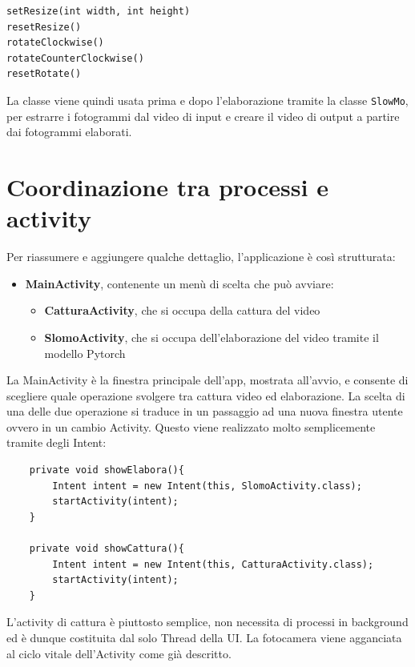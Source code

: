 \begin{lstlisting}
setResize(int width, int height)
resetResize()
rotateClockwise()
rotateCounterClockwise()
resetRotate()
\end{lstlisting}

La classe viene quindi usata prima e dopo l'elaborazione tramite la classe \texttt{SlowMo}, 
per estrarre i fotogrammi dal video di input e creare il video di output a partire dai
fotogrammi elaborati.

\section{Coordinazione tra processi e activity}

Per riassumere e aggiungere qualche dettaglio, l'applicazione è così strutturata:

\begin{itemize}
    \item \textbf{MainActivity}, contenente un menù di scelta che può avviare:
    \begin{itemize}
        \item \textbf{CatturaActivity}, che si occupa della cattura del video
        \item \textbf{SlomoActivity}, che si occupa dell'elaborazione del video tramite il modello Pytorch
    \end{itemize}
\end{itemize}

La MainActivity è la finestra principale dell'app, mostrata all'avvio, e consente di scegliere quale operazione svolgere
tra cattura video ed elaborazione. La scelta di una delle due operazione si traduce in un passaggio ad una nuova
finestra utente ovvero in un cambio Activity. Questo viene realizzato molto semplicemente tramite degli Intent:

\begin{lstlisting}
    private void showElabora(){
        Intent intent = new Intent(this, SlomoActivity.class);
        startActivity(intent);
    }

    private void showCattura(){
        Intent intent = new Intent(this, CatturaActivity.class);
        startActivity(intent);
    }
\end{lstlisting}

L'activity di cattura è piuttosto semplice, non necessita di processi in background ed è dunque costituita dal solo Thread
della UI. La fotocamera viene agganciata al ciclo vitale dell'Activity come già descritto.


